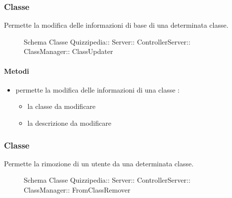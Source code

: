\subsubsection{Classe }
Permette la modifica delle informazioni di base di una determinata classe.
\begin{figure}[H]
\centering
\noindent{}
\caption[Schema Classe ClassUpdater]{Schema Classe Quizzipedia:: Server:: ControllerServer:: ClassManager:: ClassUpdater}
\end{figure}
\paragraph{Metodi}
\begin{itemize}
\item {}
\newline
permette la modifica delle informazioni di una classe
\newline
{} :
\begin{itemize}
\item {}
\newline
la classe da modificare
\item {}
\newline
la descrizione da modificare
\end{itemize}
\end{itemize}
\subsubsection{Classe }
Permette la rimozione di un utente da una determinata classe.
\begin{figure}[H]
\centering
\noindent{}
\caption[Schema Classe FromClassRemover]{Schema Classe Quizzipedia:: Server:: ControllerServer:: ClassManager:: FromClassRemover}
\end{figure}
